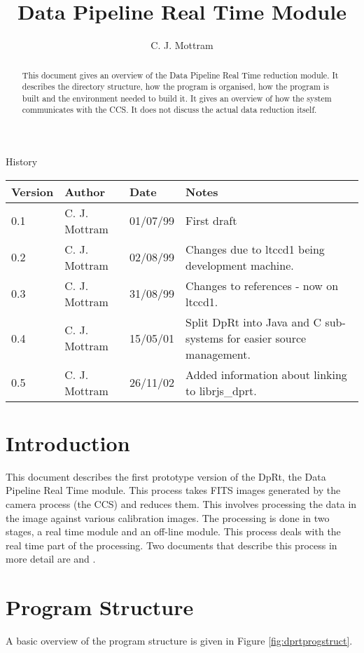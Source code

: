 \documentclass[10pt,a4paper]{article}
\title{Data Pipeline Real Time Module}
\author{C. J. Mottram}
\date{}
\begin{document}
\thispagestyle{empty}
\maketitle
\begin{abstract}
This document gives an overview of the Data Pipeline Real Time reduction module. It describes the directory structure,
how the program is organised, how the program is built and the environment needed to build it. It gives an overview
of how the system communicates with the CCS. It does not discuss the actual data reduction itself.
\end{abstract}

\centerline{\Large History}
\begin{center}
\begin{tabular}{|l|l|l|p{15em}|}
\hline
{\bf Version} & {\bf Author} & {\bf Date} & {\bf Notes} \\
\hline
0.1 & C. J. Mottram & 01/07/99 & First draft \\
0.2 & C. J. Mottram & 02/08/99 & Changes due to ltccd1 being development machine. \\
0.3 & C. J. Mottram & 31/08/99 & Changes to references - now on ltccd1. \\
0.4 & C. J. Mottram & 15/05/01 & Split DpRt into Java and C sub-systems for easier source management. \\
0.5 & C. J. Mottram & 26/11/02 & Added information about linking to librjs\_dprt. \\
\hline
\end{tabular}
\end{center}

\newpage
\tableofcontents
\listoffigures
\listoftables
\newpage

\section{Introduction}
This document describes the first prototype version of the DpRt, the Data Pipeline Real Time module. This process
takes FITS images generated by the camera process (the CCS) and reduces them. This involves processing the data
in the image against various calibration images. The processing is done in two stages, a  real time
module and an off-line module. This process deals with the real time part of the processing. 
Two documents that describe this process in more detail are \cite{bib:ltpf} and \cite{bib:drpl}.

\section{Program Structure}
A basic overview of the program structure is given in Figure \ref{fig:dprtprogstruct}.
\end{document}
